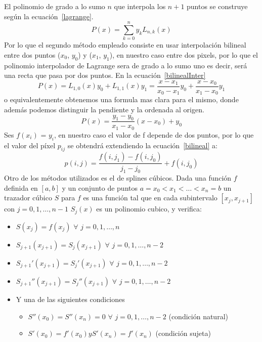 \documentclass[a4paper]{article}
\begin{document}
El polinomio de grado a lo sumo $ n $ que interpola los $ n +1 $ puntos se construye según la ecuación~\ref{lagrange}.
\begin{equation}
P(x)= \sum_{k=0}^{n}y_{k}L_{n,k}(x)
\label{lagrange}
\end{equation}
Por lo que el segundo método empleado consiste en usar interpolación bilineal entre dos puntos ($ x_{0} $, $ y_{0} $) y ($ x_{1} $, $ y_{1} $), en nuestro caso entre dos pixels, por lo que el polinomio interpolador de Lagrange sera de grado a lo sumo uno es decir, será una recta que pasa por dos puntos. En la ecuación~\ref{bilinealInter}
\begin{equation}
P(x)= L_{1,0}(x)y_{0} + L_{1,1}(x)y_{1} = \frac{x -x_{1}}{x_{0}-x_{1}}y_0 + \frac{x-x_{0}}{x_{1}-x_{0}} y_{1}
\label{bilinealInter}
\end{equation}
o equivalentemente obtenemos una formula mas clara para el mismo, donde además podemos distinguir la pendiente y la ordenada al origen.
\begin{equation}
P(x)= \frac{y_{1}-y_{0}}{x_{1}-x_{0}}(x - x_{0}) + y_{0}
\label{bilineal}
\end{equation}
Ses $f(x_i)$ = $y_i$, en nuestro caso el valor de f depende de dos puntos, por lo que el valor del píxel $p_{ij}$ se obtendrá extendiendo la ecuación~\ref{bilineal} a:
\begin{equation}
p(i, j) = \frac{f(i, j_1)-f(i,j_0)}{j_1 - j_0} + f(i,j_0)
\end{equation}
Otro de los métodos utilizados es el de splines cúbicos. Dada una función $f$ definida en $[a,b]$ y un conjunto de puntos $a=x_0<x_1<\ldots<x_n=b$ un trazador cúbico $S$ para $f$ es una función tal que en cada subintervalo $[x_j, x_{j+1}]$ con  $j=0,1,\ldots,n-1$ $S_j(x)$ es un polinomio cubico, y verifica:
\begin{itemize}
  \item $S(x_j)=f(x_j)$ $ \forall $ $j=0,1,\ldots,n$
  \item $S_{j+1}(x_{j+1})=S_j(x_{j+1})$ $ \forall $ $j=0,1,\ldots,n-2$
  \item $S_{j+1}'(x_{j+1})=S_j'(x_{j+1})$ $ \forall $ $j=0,1,\ldots,n-2$
  \item $S_{j+1}''(x_{j+1})=S_j''(x_{j+1})$ $ \forall $ $j=0,1,\ldots,n-2$
  \item Y una de las siguientes condiciones
        \begin{itemize}
                \item $S''(x_0)=S''(x_n)=0$ $ \forall $ $j=0,1,\ldots,n-2$ (condición natural)
                 \item $S'(x_0)=f'(x_0) y S'(x_n)=f'(x_n)$ (condición sujeta)
        \end{itemize}
\end{itemize}
\end{document}
